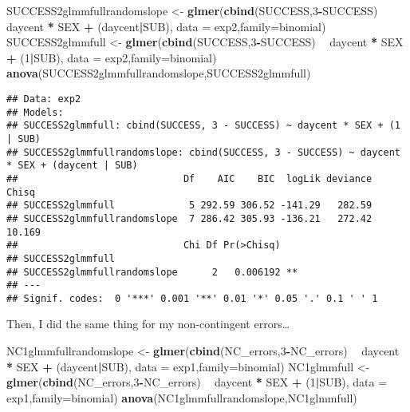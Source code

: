 \documentclass[]{article}
\newenvironment{Shaded}{\begin{snugshade}}{\end{snugshade}}
\newcommand{\KeywordTok}[1]{\textcolor[rgb]{0.13,0.29,0.53}{\textbf{#1}}}
\newcommand{\DataTypeTok}[1]{\textcolor[rgb]{0.13,0.29,0.53}{#1}}
\newcommand{\DecValTok}[1]{\textcolor[rgb]{0.00,0.00,0.81}{#1}}
\newcommand{\StringTok}[1]{\textcolor[rgb]{0.31,0.60,0.02}{#1}}
\newcommand{\OperatorTok}[1]{\textcolor[rgb]{0.81,0.36,0.00}{\textbf{#1}}}
\newcommand{\NormalTok}[1]{#1}
\begin{document}
\begin{Shaded}
\begin{Highlighting}[]
\NormalTok{SUCCESS2glmmfullrandomslope <-}\StringTok{ }\KeywordTok{glmer}\NormalTok{(}\KeywordTok{cbind}\NormalTok{(SUCCESS,}\DecValTok{3}\OperatorTok{-}\NormalTok{SUCCESS) }\OperatorTok{~}\StringTok{ }\NormalTok{daycent }\OperatorTok{*}\StringTok{ }\NormalTok{SEX }\OperatorTok{+}\StringTok{ }\NormalTok{(daycent}\OperatorTok{|}\NormalTok{SUB), }\DataTypeTok{data =}\NormalTok{ exp2,}\DataTypeTok{family=}\NormalTok{binomial)}
\NormalTok{SUCCESS2glmmfull <-}\StringTok{ }\KeywordTok{glmer}\NormalTok{(}\KeywordTok{cbind}\NormalTok{(SUCCESS,}\DecValTok{3}\OperatorTok{-}\NormalTok{SUCCESS) }\OperatorTok{~}\StringTok{ }\NormalTok{daycent }\OperatorTok{*}\StringTok{ }\NormalTok{SEX }\OperatorTok{+}\StringTok{ }\NormalTok{(}\DecValTok{1}\OperatorTok{|}\NormalTok{SUB), }\DataTypeTok{data =}\NormalTok{ exp2,}\DataTypeTok{family=}\NormalTok{binomial)}
\KeywordTok{anova}\NormalTok{(SUCCESS2glmmfullrandomslope,SUCCESS2glmmfull)}
\end{Highlighting}
\end{Shaded}

\begin{verbatim}
## Data: exp2
## Models:
## SUCCESS2glmmfull: cbind(SUCCESS, 3 - SUCCESS) ~ daycent * SEX + (1 | SUB)
## SUCCESS2glmmfullrandomslope: cbind(SUCCESS, 3 - SUCCESS) ~ daycent * SEX + (daycent | SUB)
##                             Df    AIC    BIC  logLik deviance  Chisq
## SUCCESS2glmmfull             5 292.59 306.52 -141.29   282.59       
## SUCCESS2glmmfullrandomslope  7 286.42 305.93 -136.21   272.42 10.169
##                             Chi Df Pr(>Chisq)   
## SUCCESS2glmmfull                                
## SUCCESS2glmmfullrandomslope      2   0.006192 **
## ---
## Signif. codes:  0 '***' 0.001 '**' 0.01 '*' 0.05 '.' 0.1 ' ' 1
\end{verbatim}

Then, I did the same thing for my non-contingent errors\ldots{}

\begin{Shaded}
\begin{Highlighting}[]
\NormalTok{NC1glmmfullrandomslope <-}\StringTok{ }\KeywordTok{glmer}\NormalTok{(}\KeywordTok{cbind}\NormalTok{(NC_errors,}\DecValTok{3}\OperatorTok{-}\NormalTok{NC_errors) }\OperatorTok{~}\StringTok{ }\NormalTok{daycent }\OperatorTok{*}\StringTok{ }\NormalTok{SEX }\OperatorTok{+}\StringTok{ }\NormalTok{(daycent}\OperatorTok{|}\NormalTok{SUB), }\DataTypeTok{data =}\NormalTok{ exp1,}\DataTypeTok{family=}\NormalTok{binomial)}
\NormalTok{NC1glmmfull <-}\StringTok{ }\KeywordTok{glmer}\NormalTok{(}\KeywordTok{cbind}\NormalTok{(NC_errors,}\DecValTok{3}\OperatorTok{-}\NormalTok{NC_errors) }\OperatorTok{~}\StringTok{ }\NormalTok{daycent }\OperatorTok{*}\StringTok{ }\NormalTok{SEX }\OperatorTok{+}\StringTok{ }\NormalTok{(}\DecValTok{1}\OperatorTok{|}\NormalTok{SUB), }\DataTypeTok{data =}\NormalTok{ exp1,}\DataTypeTok{family=}\NormalTok{binomial)}
\KeywordTok{anova}\NormalTok{(NC1glmmfullrandomslope,NC1glmmfull)}
\end{Highlighting}
\end{Shaded}
\end{document}
